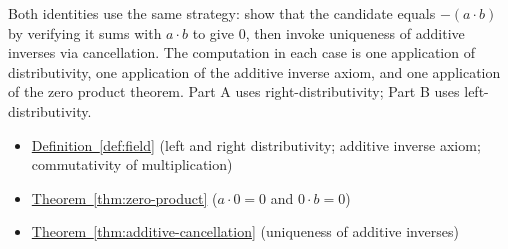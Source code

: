 \begin{remark*}
Both identities use the same strategy: show that the candidate equals
$-(a\cdot b)$ by verifying it sums with $a\cdot b$ to give $0$, then invoke
uniqueness of additive inverses via cancellation.  The computation in each
case is one application of distributivity, one application of the additive
inverse axiom, and one application of the zero product theorem.  Part A uses
right-distributivity; Part B uses left-distributivity.
\end{remark*}

\begin{dependencies}
\begin{itemize}
  \item \hyperref[def:field]{Definition~\ref*{def:field}}
        \textnormal{(left and right distributivity; additive inverse axiom;
        commutativity of multiplication)}
  \item \hyperref[thm:zero-product]{Theorem~\ref*{thm:zero-product}}
        \textnormal{($a\cdot 0 = 0$ and $0\cdot b = 0$)}
  \item \hyperref[thm:additive-cancellation]{Theorem~\ref*{thm:additive-cancellation}}
        \textnormal{(uniqueness of additive inverses)}
\end{itemize}
\end{dependencies}

\clearpage
